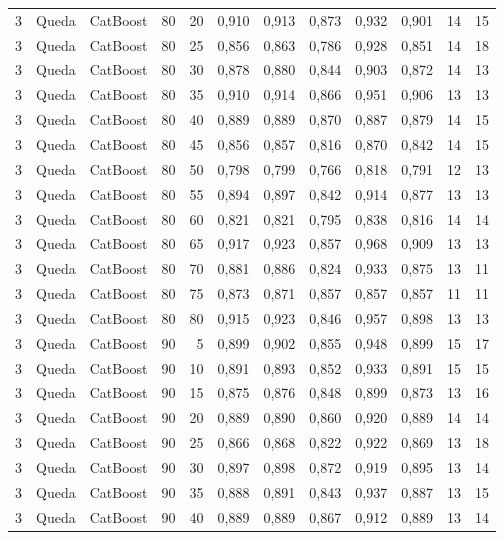 \begin{longtable}{@{}rllrrrrrrrrr@{}}
3 & Queda & CatBoost & 80 & 20 & 0,910 & 0,913 & 0,873 & 0,932 & 0,901 & 14 & 15 \\
3 & Queda & CatBoost & 80 & 25 & 0,856 & 0,863 & 0,786 & 0,928 & 0,851 & 14 & 18 \\
3 & Queda & CatBoost & 80 & 30 & 0,878 & 0,880 & 0,844 & 0,903 & 0,872 & 14 & 13 \\
3 & Queda & CatBoost & 80 & 35 & 0,910 & 0,914 & 0,866 & 0,951 & 0,906 & 13 & 13 \\
3 & Queda & CatBoost & 80 & 40 & 0,889 & 0,889 & 0,870 & 0,887 & 0,879 & 14 & 15 \\
3 & Queda & CatBoost & 80 & 45 & 0,856 & 0,857 & 0,816 & 0,870 & 0,842 & 14 & 15 \\
3 & Queda & CatBoost & 80 & 50 & 0,798 & 0,799 & 0,766 & 0,818 & 0,791 & 12 & 13 \\
3 & Queda & CatBoost & 80 & 55 & 0,894 & 0,897 & 0,842 & 0,914 & 0,877 & 13 & 13 \\
3 & Queda & CatBoost & 80 & 60 & 0,821 & 0,821 & 0,795 & 0,838 & 0,816 & 14 & 14 \\
3 & Queda & CatBoost & 80 & 65 & 0,917 & 0,923 & 0,857 & 0,968 & 0,909 & 13 & 13 \\
3 & Queda & CatBoost & 80 & 70 & 0,881 & 0,886 & 0,824 & 0,933 & 0,875 & 13 & 11 \\
3 & Queda & CatBoost & 80 & 75 & 0,873 & 0,871 & 0,857 & 0,857 & 0,857 & 11 & 11 \\
3 & Queda & CatBoost & 80 & 80 & 0,915 & 0,923 & 0,846 & 0,957 & 0,898 & 13 & 13 \\
3 & Queda & CatBoost & 90 & 5 & 0,899 & 0,902 & 0,855 & 0,948 & 0,899 & 15 & 17 \\
3 & Queda & CatBoost & 90 & 10 & 0,891 & 0,893 & 0,852 & 0,933 & 0,891 & 15 & 15 \\
3 & Queda & CatBoost & 90 & 15 & 0,875 & 0,876 & 0,848 & 0,899 & 0,873 & 13 & 16 \\
3 & Queda & CatBoost & 90 & 20 & 0,889 & 0,890 & 0,860 & 0,920 & 0,889 & 14 & 14 \\
3 & Queda & CatBoost & 90 & 25 & 0,866 & 0,868 & 0,822 & 0,922 & 0,869 & 13 & 18 \\
3 & Queda & CatBoost & 90 & 30 & 0,897 & 0,898 & 0,872 & 0,919 & 0,895 & 13 & 14 \\
3 & Queda & CatBoost & 90 & 35 & 0,888 & 0,891 & 0,843 & 0,937 & 0,887 & 13 & 15 \\
3 & Queda & CatBoost & 90 & 40 & 0,889 & 0,889 & 0,867 & 0,912 & 0,889 & 13 & 14 \\

\end{longtable}
